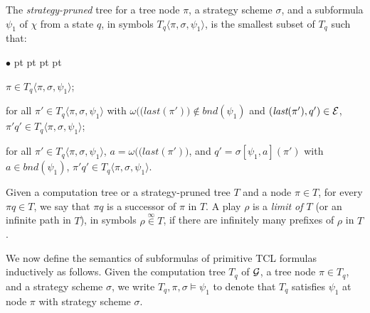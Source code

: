 \documentclass{llncs}
\newcommand{\embnd}{\textit{bnd}}
\newcommand{\cale}{{\cal E}}
\newcommand{\calg}{{\cal G}}
\newcommand{\emlast}{\textit{last}}
\newenvironment{list1}{\begin{list}{$\bullet$}
{\topsep 0 pt \parsep 0 pt \partopsep 0 pt \itemsep 0 pt}}{\end{list}}
\begin{document}
The {\em strategy-pruned} tree for a tree node $\pi$, 
a strategy scheme $\sigma$,
and a subformula $\psi_1$ of $\chi$ from a state $q$, 
in symbols $T_q\langle\pi,\sigma,\psi_1\rangle$, 
is the smallest subset of $T_q$ such that: 
\begin{list1} 
\item $\pi\in T_q\langle\pi,\sigma,\psi_1\rangle$;  
\item for all $\pi' \in T_q\langle\pi,\sigma,\psi_1\rangle$ 
  with $\omega\big((\emlast(\pi')\big)\notin\embnd(\psi_1)$ 
  and $(\emlast(\pi'),q')\in \cale$, 
  $\pi' q'\in T_q\langle\pi,\sigma,\psi_1\rangle$;  
\item for all $\pi' \in T_q\langle\pi,\sigma,\psi_1\rangle$,  
  $a=\omega\big((\emlast(\pi')\big)$, and 
  $q'=\sigma[\psi_1,a](\pi')$ 
  with $a\in\embnd(\psi_1)$, 
  $\pi' q' \in T_q\langle\pi,\sigma,\psi_1\rangle$.
\end{list1}
Given a computation tree or a strategy-pruned tree $T$ and a node $\pi\in T$, 
for every $\pi q\in T$, we say that $\pi q$ is a successor of $\pi$ in $T$. 
A play $\rho$ is a \emph{limit of $T$} (or an infinite path in $T$), in symbols $\rho\stackrel{\infty}\in T$, 
if there are infinitely many prefixes of $\rho$ in $T$. 


We now define the semantics of subformulas of primitive TCL formulas 
inductively as follows.  
Given the computation tree $T_q$ of $\calg$, a tree node $\pi\in T_q$, 
and a strategy scheme $\sigma$, 
we write $T_q,\pi,\sigma\models\psi_1$ to denote that 
$T_q$ satisfies $\psi_1$ at node $\pi$ with strategy scheme $\sigma$.
\end{document}
